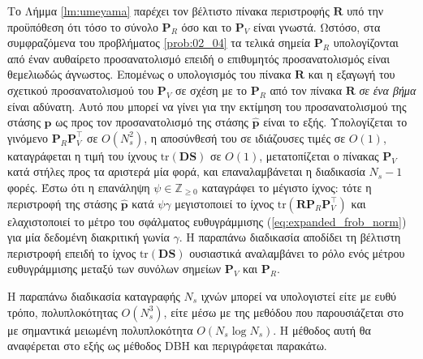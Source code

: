 Το Λήμμα \ref{lm:umeyama} παρέχει τον βέλτιστο πίνακα περιστροφής $\bm{R}$ υπό
την προϋπόθεση ότι τόσο το σύνολο $\bm{P}_R$ όσο και το $\bm{P}_V$ είναι
γνωστά.  Ωστόσο, στα συμφραζόμενα του προβλήματος \ref{prob:02_04} τα τελικά
σημεία $\bm{P}_R$ υπολογίζονται από έναν αυθαίρετο προσανατολισμό επειδή ο
επιθυμητός προσανατολισμός είναι θεμελιωδώς άγνωστος. Επομένως ο υπολογισμός
του πίνακα $\bm{R}$ και η εξαγωγή  του σχετικού προσανατολισμού του $\bm{P}_V$
σε σχέση με το $\bm{P}_R$ από τον πίνακα $\bm{R}$ \textit{σε ένα βήμα} είναι
αδύνατη. Αυτό που μπορεί να γίνει για την εκτίμηση του προσανατολισμού της
στάσης $\bm{p}$ ως προς τον προσανατολισμό της στάσης $\hat{\bm{p}}$ είναι το
εξής. Υπολογίζεται το γινόμενο $\bm{P}_R \bm{P}_V^\top$ σε $O(N_s^2)$, η
αποσύνθεσή του σε ιδιάζουσες τιμές σε $O(1)$, καταγράφεται η τιμή του ίχνους
$\text{tr}(\bm{D}\bm{S})$ σε $O(1)$, μετατοπίζεται ο πίνακας $\bm{P}_V$ κατά
στήλες προς τα αριστερά μία φορά, και επαναλαμβάνεται η διαδικασία $N_s-1$
φορές. Έστω ότι η επανάληψη $\psi \in \mathbb{Z}_{\geq 0}$ καταγράφει το
μέγιστο ίχνος: τότε η περιστροφή της στάσης $\hat{\bm{p}}$ κατά $\psi \gamma$
μεγιστοποιεί το ίχνος $\text{tr}(\bm{R} \bm{P}_R \bm{P}_V^\top)$ και
ελαχιστοποιεί το μέτρο του σφάλματος ευθυγράμμισης
(\ref{eq:expanded_frob_norm}) για μία δεδομένη διακριτική γωνία $\gamma$. Η
παραπάνω διαδικασία αποδίδει τη βέλτιστη περιστροφή επειδή το ίχνος
$\text{tr}(\bm{D}\bm{S})$ ουσιαστικά αναλαμβάνει το ρόλο ενός μέτρου
ευθυγράμμισης μεταξύ των συνόλων σημείων $\bm{P}_V$ και $\bm{P}_R$.

Η παραπάνω διαδικασία καταγραφής $N_s$ ιχνών μπορεί να υπολογιστεί είτε με ευθύ
τρόπο, πολυπλοκότητας $O(N_s^3)$, είτε μέσω με της μεθόδου που παρουσιάζεται
στο \cite{Dogan2015} με σημαντικά μειωμένη πολυπλοκότητα $O(N_s \log N_s)$.  Η
μέθοδος αυτή θα αναφέρεται στο εξής ως μέθοδος DBH και περιγράφεται παρακάτω.


